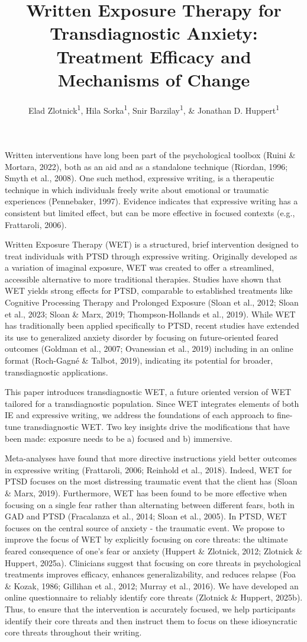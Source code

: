 \documentclass[
  man,floatsintext]{apa7}
\title{Written Exposure Therapy for Transdiagnostic Anxiety: Treatment Efficacy and Mechanisms of Change}
\author{Elad Zlotnick\textsuperscript{1}, Hila Sorka\textsuperscript{1}, Snir Barzilay\textsuperscript{1}, \& Jonathan D. Huppert\textsuperscript{1}}
\date{}
\affiliation{\vspace{0.5cm}\textsuperscript{1} The Hebrew University of Jerusalem}
\begin{document}
\maketitle

Written interventions have long been part of the psychological toolbox (Ruini \& Mortara, 2022),
both as an aid and as a standalone technique (Riordan, 1996; Smyth et al., 2008).
One such method, expressive writing, is a therapeutic technique in which individuals freely write about emotional or traumatic experiences (Pennebaker, 1997).
Evidence indicates that expressive writing has a consistent but limited effect, but can be more effective in focused contexts (e.g., Frattaroli, 2006).

Written Exposure Therapy (WET) is a structured, brief intervention designed to treat individuals with PTSD through expressive writing.
Originally developed as a variation of imaginal exposure, WET was created to offer a streamlined, accessible alternative to more traditional therapies.
Studies have shown that WET yields strong effects for PTSD, comparable to established treatments like Cognitive Processing Therapy and Prolonged Exposure (Sloan et al., 2012; Sloan et al., 2023; Sloan \& Marx, 2019; Thompson-Hollands et al., 2019).
While WET has traditionally been applied specifically to PTSD, recent studies have extended its use to generalized anxiety disorder by focusing on future-oriented feared outcomes (Goldman et al., 2007; Ovanessian et al., 2019) including in an online format (Roch-Gagné \& Talbot, 2019), indicating its potential for broader, transdiagnostic applications.

This paper introduces transdiagnostic WET, a future oriented version of WET tailored for a transdiagnostic population.
Since WET integrates elements of both IE and expressive writing, we address the foundations of each approach to fine-tune transdiagnostic WET.
Two key insights drive the modifications that have been made: exposure needs to be a) focused and b) immersive.

Meta-analyses have found that more directive instructions yield better outcomes in expressive writing (Frattaroli, 2006; Reinhold et al., 2018).
Indeed, WET for PTSD focuses on the most distressing traumatic event that the client has (Sloan \& Marx, 2019).
Furthermore, WET has been found to be more effective when focusing on a single fear rather than alternating between different fears, both in GAD and PTSD (Fracalanza et al., 2014; Sloan et al., 2005).
In PTSD, WET focuses on the central source of anxiety - the traumatic event.
We propose to improve the focus of WET by explicitly focusing on core threats: the ultimate feared consequence of one's fear or anxiety (Huppert \& Zlotnick, 2012; Zlotnick \& Huppert, 2025a).
Clinicians suggest that focusing on core threats in psychological treatments improves efficacy, enhances generalizability, and reduces relapse
(Foa \& Kozak, 1986; Gillihan et al., 2012; Murray et al., 2016).
We have developed an online questionnaire to reliably identify core threats (Zlotnick \& Huppert, 2025b).
Thus, to ensure that the intervention is accurately focused, we help participants identify their core threats and then instruct them to focus on these idiosyncratic core threats throughout their writing.
\end{document}
